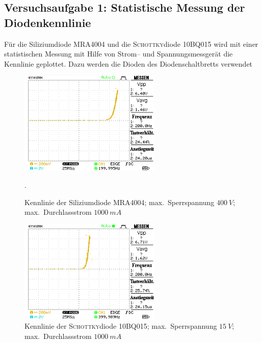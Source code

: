 \documentclass[a4paper,10pt]{article}
\numberwithin{equation}{section}
\begin{document}
\subsection{Versuchsaufgabe 1: Statistische Messung der Diodenkennlinie}
Für die Siliziumdiode MRA4004 und die \textsc{Schottky}diode 10BQ015 wird mit einer statistischen Messung mit Hilfe von Strom-- und Spannungsmessgerät die Kennlinie geplottet.
Dazu werden die Dioden des Diodenschaltbretts verwendet

\newpage
\begin{figure}[h]
        \centering
        \includegraphics[width=0.6\textwidth]{data/Kennlinie_a1_d1.BMP.png}
        \caption{Kennlinie der Siliziumdiode MRA4004; max.\ Sperrspannung $\SI{400}{V}$; max.\ Durchlassstrom $\SI{1000}{mA}$}.
\end{figure}
\begin{figure}[h]
        \centering
        \includegraphics[width=0.6\textwidth]{data/Kennlinie_a1_d2.BMP.png}
        \caption{Kennlinie der \textsc{Schottky}diode 10BQ015; max.\ Sperrspannung $\SI{15}{V}$; max.\ Durchlassstrom $\SI{1000}{mA}$}
\end{figure}

\newpage
\listoffigures
\listoftables



\end{document}
